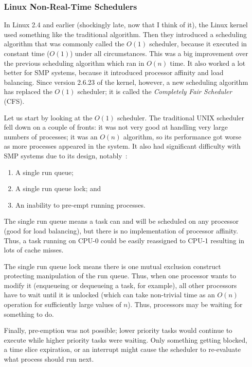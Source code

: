 \subsubsection*{Linux Non-Real-Time Schedulers}
In Linux 2.4 and earlier (shockingly late, now that I think of it), the Linux kernel used something like the traditional algorithm. Then they introduced a scheduling algorithm that was commonly called the $O(1)$ scheduler, because it executed in constant time ($O(1)$) under all circumstances. This was a big improvement over the previous scheduling algorithm which ran in $O(n)$ time. It also worked a lot better for SMP systems, because it introduced processor affinity and load balancing. Since version 2.6.23 of the kernel, however, a new scheduling algorithm has replaced the $O(1)$ scheduler; it is called the \textit{Completely Fair Scheduler} (CFS).

Let us start by looking at the $O(1)$ scheduler. The traditional UNIX scheduler fell down on a couple of fronts: it was not very good at handling very large numbers of processes; it was an $O(n)$ algorithm, so its performance got worse as more processes appeared in the system. It also had significant difficulty with SMP systems due to its design, notably~\cite{osi}:

\begin{enumerate}
	\item A single run queue;
	\item A single run queue lock; and
	\item An inability to pre-empt running processes.
\end{enumerate}

The single run queue means a task can and will be scheduled on any processor (good for load balancing), but there is no implementation of processor affinity. Thus, a task running on CPU-0 could be easily reassigned to CPU-1 resulting in lots of cache misses.

The single run queue lock means there is one mutual exclusion construct protecting manipulation of the run queue. Thus, when one processor wants to modify it (enqueueing or dequeueing a task, for example), all other processors have to wait until it is unlocked (which can take non-trivial time as an $O(n)$ operation for sufficiently large values of $n$). Thus, processors may be waiting for something to do.

Finally, pre-emption was not possible; lower priority tasks would continue to execute while higher priority tasks were waiting. Only something getting blocked, a time slice expiration, or an interrupt might cause the scheduler to re-evaluate what process should run next.


